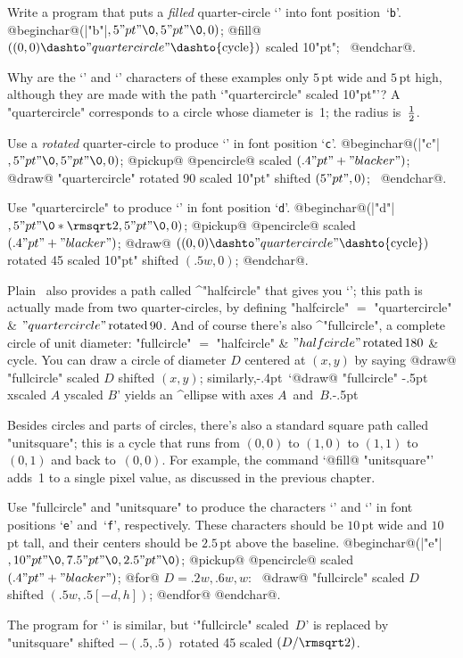 {{{{\exercise
Write a program that puts a {\sl filled\/} quarter-circle
`\kern1pt{\manual\circb}' into font position~`{\tt b}'.
\answer @beginchar@\kern1pt(|"b"|$,5"pt"\0,5"pt"\0,0)$;\parbreak
@fill@ $((0,0)\dashto"quartercircle"\dashto{\rm cycle})$
scaled 10"pt"; \ @endchar@.

\exercise
Why are the `\kern1pt{\manual\circa}' and `\kern1pt{\manual\circb}'
characters of these examples only $5\,$pt wide and $5\,$pt high, although
they are made with the path `"quartercircle" scaled 10"pt"'?
\answer A "quartercircle" corresponds to a circle whose diameter
is~1; the radius is~$1\over2$.

\exercise
Use a {\sl rotated\/} quarter-circle to produce `{\manual\circc}\kern1pt'
in font position `{\tt c}'.
\answer @beginchar@\kern1pt(|"c"|$,5"pt"\0,5"pt"\0,0)$;\parbreak
@pickup@ @pencircle@ scaled $(.4"pt"+"blacker")$;\parbreak
@draw@ "quartercircle" rotated 90 scaled 10"pt" shifted $(5"pt",0)$;
 \ @endchar@.

\dangerexercise
Use "quartercircle" to produce `\kern1pt{\manual\circd}\kern1pt'
in font position `{\tt d}'.
\answer @beginchar@\kern1pt(|"d"|$,5"pt"\0\ast\rmsqrt2,5"pt"\0,0)$;\parbreak
@pickup@ @pencircle@ scaled $(.4"pt"+"blacker")$;\parbreak
@draw@ $((0,0)\dashto"quartercircle"\dashto{\rm cycle})$
 rotated 45 scaled 10"pt" shifted $(.5w,0)$;\parbreak
@endchar@.

Plain \MF\ also provides a path called ^"halfcircle" that gives you
`{\manual\circc\circa}'; this path is actually made from two
quarter-circles, by defining
\begindisplay
"halfcircle" $=$ "quartercircle" \& $"quartercircle"\,{\rm rotated}\,90$.
\enddisplay
And of course there's also ^"fullcircle", a complete circle of unit diameter:
\begindisplay
"fullcircle" $=$ "halfcircle" \& $"halfcircle"\,{\rm rotated}\,180$ \& cycle.
\enddisplay
You can draw a circle of diameter $D$ centered at $(x,y)$ by saying
\begindisplay
@draw@ "fullcircle" scaled $D$ shifted $(x,y)$;
\enddisplay
similarly,\kern-.4pt\ `@draw@ "fullcircle" \kern-.5pt
xscaled \kern-1pt$A$ yscaled \kern-1pt$B$'
yields an ^{ellipse} with axes $A$~and~$B$\kern-1.3pt.\kern-.5pt

Besides circles and parts of circles, there's also a standard square path
called "unitsquare"; this is a cycle that runs from $(0,0)$ to $(1,0)$
to $(1,1)$ to $(0,1)$ and back to~$(0,0)$. For example, the command
`@fill@ "unitsquare"' adds~1 to a single pixel value, as discussed in
the previous chapter.

\exercise Use "fullcircle" and "unitsquare" to produce the characters
`{\manual\circe}' and `{\manual\circf}' in font positions `{\tt e}'
and~`{\tt f}', respectively. These characters should be $10\,$pt wide
and $10\,$pt tall, and their centers should be $2.5\,$pt above
the baseline.
\answer @beginchar@\kern1pt(|"e"|$,10"pt"\0,7.5"pt"\0,2.5"pt"\0)$;\parbreak
@pickup@ @pencircle@ scaled $(.4"pt"+"blacker")$;\parbreak
@for@ $D=.2w,.6w,w$: \
@draw@ "fullcircle" scaled $D$ shifted $(.5w,.5[-d,h])$;\parbreak
@endfor@ @endchar@.
\par\medskip\noindent
The program for `{\manual\circf}' is similar, but `"fullcircle"
scaled~$D$' is replaced by
\begindisplay
"unitsquare" shifted $-(.5,.5)$ rotated 45 scaled $(D/\rmsqrt2)$.
\enddisplay

}}}}
